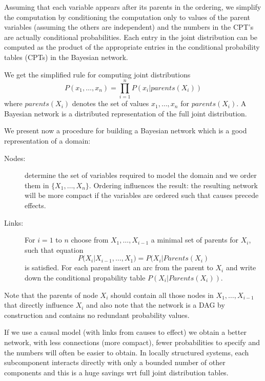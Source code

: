 Assuming that each variable appears after its parents in the ordering, we simplify
the computation by conditioning the computation only to values of the parent variables
(assuming the others are independent) and the numbers in the CPT's
are actually conditional probabilities.\newline
Each entry in the joint distribution can be computed as the product of the
appropriate entries in the conditional probability tables (CPTs) in the Bayesian network.

We get the simplified rule for computing joint distributions 
\[ P(x_1, \dots, x_n) = \prod _{i=1}^n P(x_i | parents(X_i)) \]
where $parents(X_i)$ denotes the set of values $x_1, \dots, x_n$ for $parents(X_i)$.\newline
A Bayesian network is a distributed representation of the full joint distribution.

We present now a procedure for building a Bayesian network which is a good representation
of a domain:
\begin{description}
   \item [Nodes: ] determine the set of variables required to model the domain and we 
	   order them in $\{X_1, \dots, X_n\}$.\newline
	   Ordering influences the result: the resulting network will be more compact
	  if the variables are ordered such that causes precede effects.
   \item [Links: ] For $i = 1$ to $n$ choose from $X_1, \dots, X_{i-1}$ a minimal set of
	   parents for $X_i$, such that equation 
	   \[ P(X_i | X_{i-1}, \dots, X_1) = P(X_i | Parents(X_i) \]
	   is satisfied.\newline
	   For each parent insert an arc from the parent to $X_i$ and write down the 
	   conditional propability table $P(X_i | Parents(X_i))$.
\end{description}
Note that the parents of node $X_i$ should contain all those nodes in 
$X_1, \dots, X_{i-1}$ that directly influence $X_i$ and also note that the network 
is a DAG by construction and contains no redundant probability values.

If we use a causal model (with links from causes to effect) we obtain a better network,
with less connections (more compact), fewer probabilities to specify and
the numbers will often be easier to obtain.\newline
In locally structured systems, each subcomponent interacts directly with only a
bounded number of other components and this is a huge savings
wrt full joint distribution tables.

